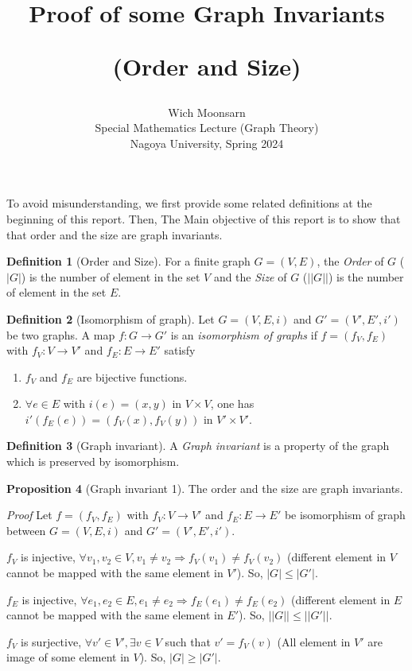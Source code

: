 \documentclass[12pt, letterpaper]{article}
\title{Proof of some Graph Invariants 

(Order and Size)}
\author{Wich Moonsarn\\Special Mathematics Lecture (Graph Theory)\\Nagoya University, Spring 2024}
\date{}
\begin{document}
\maketitle
To avoid misunderstanding, we first provide some related definitions at the beginning of this report. Then, The Main objective of this report is to show that that order and the size are graph invariants.

\textbf{Definition 1} (Order and Size). For a finite graph $G = (V, E)$, the \textit{Order} of $G$ ($\vert G \vert$) is the number of element in the set $V$ and the \textit{Size} of $G$ ($\vert\vert G \vert\vert$) is the number of element in the set $E$.

\textbf{Definition 2} (Isomorphism of graph). Let $G = (V, E, i)$ and $G' = (V', E', i')$ be two graphs. A map $f : G \rightarrow G'$ is an \textit{isomorphism of graphs} if $f = (f_V, f_E)$ with $f_V : V \rightarrow V'$ and $f_E : E \rightarrow E'$ satisfy
\begin{enumerate}
  \item $f_V$ and $f_E$ are bijective functions.
  \item $\forall e \in E$ with $i(e) = (x, y)$ in $V \times V$, one has $i'(f_E(e)) = (f_V(x), f_V(y))$ in $V' \times V'$.
\end{enumerate}

\textbf{Definition 3} (Graph invariant). A \textit{Graph invariant} is a property of the graph which is preserved by isomorphism.

\textbf{Proposition 4} (Graph invariant 1). The order and the size are graph invariants.

\textit{Proof} Let $f = (f_V, f_E)$ with $f_V : V \rightarrow V'$ and $f_E : E \rightarrow E'$ be isomorphism of graph between $G = (V, E, i)$ and $G' = (V', E', i')$. 

$f_V$ is injective, $\forall v_1, v_2 \in V, v_1 \neq v_2 \Rightarrow f_V(v_1) \neq f_V(v_2)$ (different element in $V$ cannot be mapped with the same element in $V'$). So, $\vert G \vert \leq \vert G' \vert$.

$f_E$ is injective, $\forall e_1, e_2 \in E, e_1 \neq e_2 \Rightarrow f_E(e_1) \neq f_E(e_2)$ (different element in $E$ cannot be mapped with the same element in $E'$). So, $\vert\vert G \vert\vert \leq \vert\vert G' \vert\vert$.

$f_V$ is surjective, $\forall v' \in V', \exists v \in V$ such that $v' = f_V(v)$ (All element in $V'$ are image of some element in $V$). So, $\vert G \vert \geq \vert G' \vert$.
\end{document}
